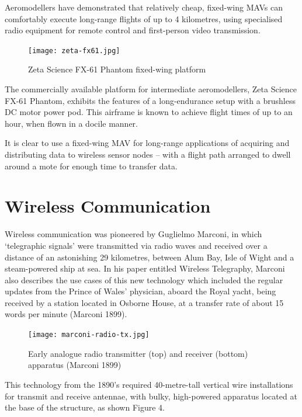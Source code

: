 Aeromodellers have demonstrated that relatively cheap, fixed-wing MAVs can comfortably execute long-range flights of up to 4 kilometres, using specialised radio equipment for remote control and first-person video transmission.

\begin{figure}
    \centering
    \texttt{[image: zeta-fx61.jpg]}
    \caption{Zeta Science FX-61 Phantom fixed-wing platform}
    \label{fig:zeta-fx61}
\end{figure}

The commercially available platform for intermediate aeromodellers, Zeta Science FX-61 Phantom, exhibits the features of a long-endurance setup with a brushless DC motor power pod. This airframe is known to achieve flight times of up to an hour, when flown in a docile manner.

It is clear to use a fixed-wing MAV for long-range applications of acquiring and distributing data to wireless sensor nodes – with a flight path arranged to dwell around a mote for enough time to transfer data.


\section{Wireless Communication}

Wireless communication was pioneered by Guglielmo Marconi, in which ‘telegraphic signals’ were transmitted via radio waves and received over a distance of an astonishing 29 kilometres, between Alum Bay, Isle of Wight and a steam-powered ship at sea. In his paper entitled Wireless Telegraphy, Marconi also describes the use cases of this new technology which included the regular updates from the Prince of Wales’ physician, aboard the Royal yacht, being received by a station located in Osborne House, at a transfer rate of about 15 words per minute (Marconi 1899).

\begin{figure}
    \centering
    \texttt{[image: marconi-radio-tx.jpg]}
    \caption{Early analogue radio transmitter (top) and receiver (bottom) apparatus (Marconi 1899)}
    \label{fig:marconi-radio-tx}
\end{figure}

This technology from the 1890’s required 40-metre-tall vertical wire installations for transmit and receive antennae, with bulky, high-powered apparatus located at the base of the structure, as shown Figure 4.

